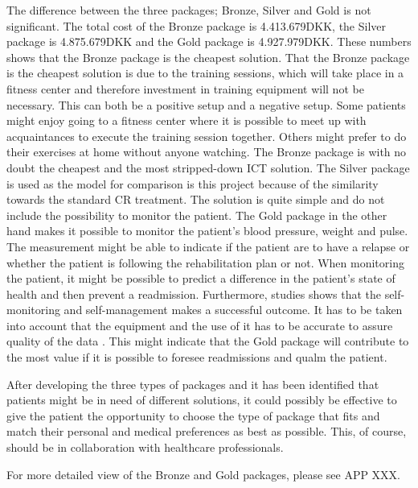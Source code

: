 The difference between the three packages; Bronze, Silver and Gold is not significant. The total cost of the Bronze package is 4.413.679DKK, the Silver package is 4.875.679DKK and the Gold package is 4.927.979DKK. These numbers shows that the Bronze package is the cheapest solution. That the Bronze package is the cheapest solution is due to the training sessions, which will take place in a fitness center and therefore investment in training equipment will not be necessary. This can both be a positive setup and a negative setup. Some patients might enjoy going to a fitness center where it is possible to meet up with acquaintances to execute the training session together. Others might prefer to do their exercises at home without anyone watching. The Bronze package is with no doubt the cheapest and the most stripped-down ICT solution. The Silver package is used as the model for comparison is this project because of the similarity towards the standard CR treatment. The solution is quite simple and do not include the possibility to monitor the patient. The Gold package in the other hand makes it possible to monitor the patient's blood pressure, weight and pulse. The measurement might be able to indicate if the patient are to have a relapse or whether the patient is following the rehabilitation plan or not. When monitoring the patient, it might be possible to predict a difference in the patient’s state of health and then prevent a readmission. Furthermore, studies shows that the self-monitoring and self-management makes a successful outcome. It has to be taken into account that the equipment and the use of it has to be accurate to assure quality of the data \cite{considerations, NationalBoardofHealth}. This might indicate that the Gold package will contribute to the most value if it is possible to foresee readmissions and qualm the patient.

After developing the three types of packages and it has been identified that patients might be in need of different solutions, it could possibly be effective to give the patient the opportunity to choose the type of package that fits and match their personal and medical preferences as best as possible. This, of course, should be in collaboration with healthcare professionals.  

For more detailed view of the Bronze and Gold packages, please see APP XXX.








